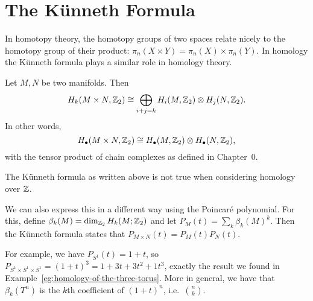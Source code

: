 \section{The Künneth Formula}
In homotopy theory, the homotopy groups of two spaces relate nicely to the homotopy group of their product: $\pi_n(X \times Y) = \pi_n(X) \times \pi_n(Y)$.
In homology the Künneth formula plays a similar role in homology theory.
\begin{prop}
    Let $M, N$ be two manifolds. Then
    \[
        H_k(M \times N, \mathbb{Z}_2) \cong
        \bigoplus_{i+j  = k} H_i(M, \mathbb{Z}_2) \otimes H_j(N, \mathbb{Z}_2)
    .\]
In other words,
\[
    H_{\bullet}(M \times N, \mathbb{Z}_2) \cong H_{\bullet}(M, \mathbb{Z}_2) \otimes H_\bullet(N, \mathbb{Z}_2)
,\] 
with the tensor product of chain complexes as defined in Chapter~0.
\end{prop}
\begin{remark}
    The Künneth formula as written above is not true when considering homology over $\mathbb{Z}$.
\end{remark}
\begin{remark}
    We can also express this in a different way using the Poincaré polynomial.
    For this, define $\beta_k(M) = \dim_{\mathbb{Z}_2} H_k(M;\mathbb{Z}_2)$ and let $P_M(t) = \sum_k \beta_k(M) ^{k}$.
    Then the Künneth formula states that $P_{M \times N}(t) = P_M(t) P_N(t)$.


    For example, we have $P_{S^{1}}(t) = 1 + t$, so $P_{S^{1}\times S^{1}\times S^{1}} = (1 + t)^3 = 1 + 3t + 3t^2 + 1t^3$, exactly the result we found in Example~\ref{eg:homology-of-the-three-torus}.
    More in general, we have that $\beta_k(T^{n})$ is the $k$th coefficient of $(1+t)^{n}$, i.e.\ $\binom{n}{k}$.
\end{remark}
